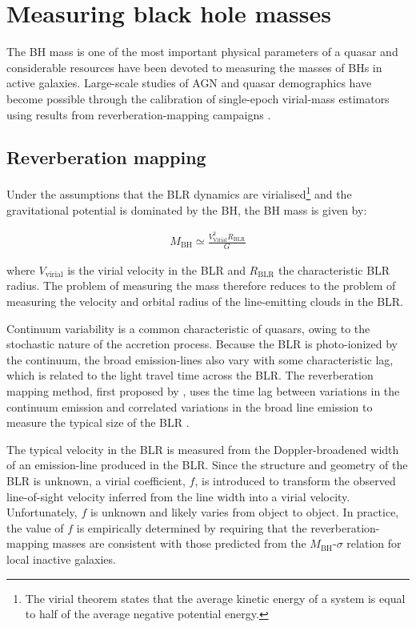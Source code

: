 \section{Measuring black hole masses}

The BH mass is one of the most important physical parameters of a quasar and considerable resources have been devoted to measuring the masses of BHs in active galaxies. 
Large-scale studies of AGN and quasar demographics have become possible through the calibration of single-epoch virial-mass estimators using results from reverberation-mapping campaigns \citep[e.g.][]{peterson10,vestergaard11,marziani12,shen13}.  

\subsection{Reverberation mapping}

Under the assumptions that the BLR dynamics are virialised\footnote{The virial theorem states that the average kinetic energy of a system is equal to half of the average negative potential energy.} and the gravitational potential is dominated by the BH, the BH mass is given by:

\begingroup\makeatletter{}\check@mathfonts
\begin{eqnarray}
M_{\text{BH}} \simeq \frac{V_{\text{Virial}}^2R_{\text{BLR}}}{G} 
\end{eqnarray}
\endgroup

\noindent where $V_{\text{virial}}$ is the virial velocity in the BLR and $R_{\text{BLR}}$ the characteristic BLR radius.
The problem of measuring the mass therefore reduces to the problem of measuring the velocity and orbital radius of the line-emitting clouds in the BLR. 

Continuum variability is a common characteristic of quasars, owing to the stochastic nature of the accretion process.  
Because the BLR is photo-ionized by the continuum, the broad emission-lines also vary with some characteristic lag, which is related to the light travel time across the BLR. 
The reverberation mapping method, first proposed by \citet{blandford82a}, uses the time lag between variations in the continuum emission and correlated variations in the broad line emission to measure the typical size of the BLR \citep[e.g.][]{peterson93,netzer97,peterson14}. 

The typical velocity in the BLR is measured from the Doppler-broadened width of an emission-line produced in the BLR. 
Since the structure and geometry of the BLR is unknown, a virial coefficient, $f$, is introduced to transform the observed line-of-sight velocity inferred from the line width into a virial velocity.
Unfortunately, $f$ is unknown and likely varies from object to object.  
In practice, the value of $f$ is empirically determined by requiring that the reverberation-mapping masses are consistent with those predicted from the $M_{\text{BH}}$-$\sigma$ relation for local inactive galaxies. 

